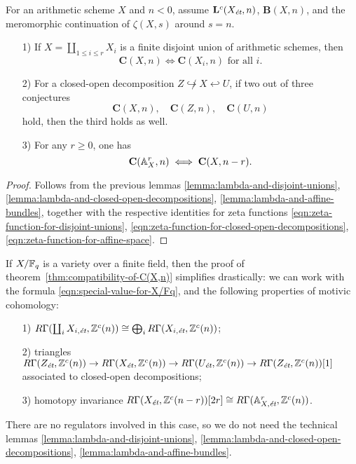 \documentclass{article}
\numberwithin{equation}{section}
\begin{document}
\begin{theorem}
  \label{thm:compatibility-of-C(X,n)}
  For an arithmetic scheme $X$ and $n < 0$, assume $\mathbf{L}^c (X_\et,n)$,
  $\mathbf{B} (X,n)$, and the meromorphic continuation of $\zeta (X,s)$ around
  $s = n$.

  \begin{enumerate}
  \item[1)] If $X = \coprod_{1 \le i \le r} X_i$ is a finite disjoint union of
    arithmetic schemes, then
    $$\mathbf{C} (X,n) \iff \mathbf{C} (X_i,n)\text{ for all }i.$$

  \item[2)] For a closed-open decomposition
    $Z \not\hookrightarrow X \hookleftarrow U$, if two out of three conjectures
    \[ \mathbf{C} (X,n), \quad
      \mathbf{C} (Z,n), \quad
      \mathbf{C} (U,n) \]
    hold, then the third holds as well.

  \item[3)] For any $r \ge 0$, one has
    $$\mathbf{C} (\AA^r_X, n) \iff \mathbf{C} (X, n-r).$$
  \end{enumerate}

  \begin{proof}
    Follows from the previous lemmas
    \ref{lemma:lambda-and-disjoint-unions},
    \ref{lemma:lambda-and-closed-open-decompositions},
    \ref{lemma:lambda-and-affine-bundles},
    together with the respective identities for zeta functions
    \eqref{eqn:zeta-function-for-disjoint-unions},
    \eqref{eqn:zeta-function-for-closed-open-decompositions},
    \eqref{eqn:zeta-function-for-affine-space}.
  \end{proof}
\end{theorem}

\begin{remark}
  If $X/\FF_q$ is a variety over a finite field, then the proof of
  theorem~\ref{thm:compatibility-of-C(X,n)} simplifies drastically: we can work
  with the formula \eqref{eqn:special-value-for-X/Fq}, and the following
  properties of motivic cohomology:
  \begin{enumerate}
  \item[1)] $R\Gamma (\coprod_i X_{i,\et}, \ZZ^c (n)) \cong
    \bigoplus_i R\Gamma (X_{i,\et}, \ZZ^c (n))$;

  \item[2)] triangles
    $R\Gamma (Z_\et, \ZZ^c (n)) \to
    R\Gamma (X_\et, \ZZ^c (n)) \to
    R\Gamma (U_\et, \ZZ^c (n)) \to
    R\Gamma (Z_\et, \ZZ^c (n))[1]$
    associated to closed-open decompositions;

  \item[3)] homotopy invariance
    $R\Gamma (X_\et, \ZZ^c (n-r)) [2r] \cong
    R\Gamma (\AA^r_{X,\et}, \ZZ^c (n))$.
  \end{enumerate}
  There are no regulators involved in this case, so we do not need the technical
  lemmas
  \ref{lemma:lambda-and-disjoint-unions},
  \ref{lemma:lambda-and-closed-open-decompositions},
  \ref{lemma:lambda-and-affine-bundles}.
\end{remark}
\end{document}
